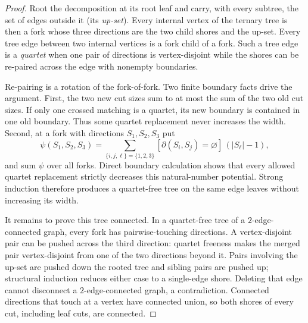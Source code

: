 \begin{proof}
Root the decomposition at its root leaf and carry, with every subtree, the
set of edges outside it (its \emph{up-set}).  Every internal vertex of the
ternary tree is then a fork whose three directions are the two child shores
and the up-set.  Every tree edge between two internal vertices is a fork
child of a fork.  Such a tree edge is a \emph{quartet} when one pair of
directions is vertex-disjoint while the shores can be re-paired across the
edge with nonempty boundaries.

Re-pairing is a rotation of the fork-of-fork.  Two finite boundary facts
drive the argument.  First, the two new cut sizes sum to at most the sum of
the two old cut sizes.  If only one crossed matching is a quartet, its new
boundary is contained in one old boundary.  Thus some quartet replacement
never increases the width.  Second, at a fork with directions $S_1,S_2,S_3$
put
\[
 \psi(S_1,S_2,S_3)=
 \sum_{\{i,j,\ell\}=\{1,2,3\}}
 [\partial(S_i,S_j)=\varnothing]\,(|S_\ell|-1),
\]
and sum $\psi$ over all forks.  Direct boundary calculation shows that every
allowed quartet replacement strictly decreases this natural-number
potential.  Strong induction therefore produces a quartet-free tree on the
same edge leaves without increasing its width.

It remains to prove this tree connected.  In a quartet-free tree of a
$2$-edge-connected graph, every fork has pairwise-touching directions.  A
vertex-disjoint pair can be pushed across the third direction: quartet
freeness makes the merged pair vertex-disjoint from one of the two directions
beyond it.  Pairs involving the up-set are pushed down the rooted tree and
sibling pairs are pushed up; structural induction reduces either case to a
single-edge shore.  Deleting that edge cannot disconnect a
$2$-edge-connected graph, a contradiction.  Connected directions that touch
at a vertex have connected union, so both shores of every cut, including
leaf cuts, are connected.
\end{proof}

